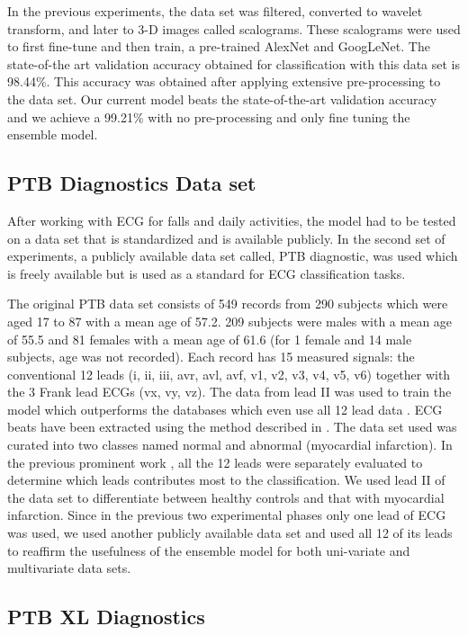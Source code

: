 \documentclass{ieeeaccess}
\begin{document}
In the previous experiments, the data set was filtered, converted to wavelet transform, and later to 3-D images called scalograms. These scalograms were used to first fine-tune and then train, a pre-trained AlexNet and GoogLeNet. The state-of-the art validation accuracy obtained for classification with this data set is 98.44\%. This accuracy was obtained after applying extensive pre-processing to the data set. Our current model beats the state-of-the-art validation accuracy and we achieve a 99.21\% with no pre-processing and only fine tuning the ensemble model.  


\subsection{PTB Diagnostics Data set}
After working with ECG for falls and daily activities, the model had to be tested on a data set that is standardized and is available publicly. In the second set of experiments, a publicly available data set called, PTB diagnostic, was used which is freely available but is used as a standard for ECG classification tasks.

The original PTB data set consists of 549 records from 290 subjects which were aged 17 to 87 with a mean age of 57.2. 209 subjects were males with a mean age of 55.5 and 81 females with a mean age of 61.6 (for 1 female and 14 male subjects, age was not recorded). Each record has 15 measured signals: the conventional 12 leads (i, ii, iii, avr, avl, avf, v1, v2, v3, v4, v5, v6) together with the 3 Frank lead ECGs (vx, vy, vz). The data from lead II was used to train the model which outperforms the databases which even use all 12 lead data \cite{ptb}. ECG beats have been extracted using the method described in \cite{8419425}. The data set used was curated into two classes named normal and abnormal (myocardial infarction).
In the previous prominent work \cite{10.1007/978-3-030-64610-3_40}, all the 12 leads were separately evaluated to determine which leads contributes most to the classification. We used lead II of the data set to differentiate between healthy controls and that with myocardial infarction. 
Since in the previous two experimental phases only one lead of ECG was used, we used another publicly available data set and used all 12 of its leads to reaffirm the usefulness of the ensemble model for both uni-variate and multivariate data sets.


\subsection{PTB XL Diagnostics}
\end{document}
